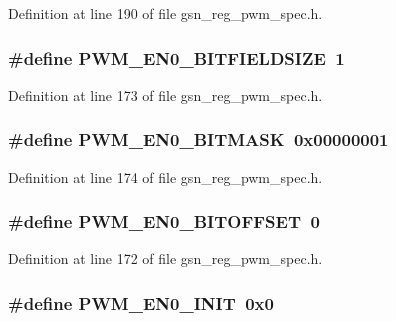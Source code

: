 Definition at line 190 of file gsn\_\-reg\_\-pwm\_\-spec.h.

\hypertarget{a00565_a63df657a3c34278532572df2feed73b0}{
\subsubsection[{PWM\_\-EN0\_\-BITFIELDSIZE}]{\setlength{\rightskip}{0pt plus 5cm}\#define PWM\_\-EN0\_\-BITFIELDSIZE~1}}
\label{a00565_a63df657a3c34278532572df2feed73b0}


Definition at line 173 of file gsn\_\-reg\_\-pwm\_\-spec.h.

\hypertarget{a00565_a1c78dc20905ee75158c8502e81d5bfb8}{
\subsubsection[{PWM\_\-EN0\_\-BITMASK}]{\setlength{\rightskip}{0pt plus 5cm}\#define PWM\_\-EN0\_\-BITMASK~0x00000001}}
\label{a00565_a1c78dc20905ee75158c8502e81d5bfb8}


Definition at line 174 of file gsn\_\-reg\_\-pwm\_\-spec.h.

\hypertarget{a00565_a1a35a931958ece14629a7abd0c028a56}{
\subsubsection[{PWM\_\-EN0\_\-BITOFFSET}]{\setlength{\rightskip}{0pt plus 5cm}\#define PWM\_\-EN0\_\-BITOFFSET~0}}
\label{a00565_a1a35a931958ece14629a7abd0c028a56}


Definition at line 172 of file gsn\_\-reg\_\-pwm\_\-spec.h.

\hypertarget{a00565_a710b5a6b2483dfbf8251fbf642be4b2e}{
\subsubsection[{PWM\_\-EN0\_\-INIT}]{\setlength{\rightskip}{0pt plus 5cm}\#define PWM\_\-EN0\_\-INIT~0x0}}
\label{a00565_a710b5a6b2483dfbf8251fbf642be4b2e}


